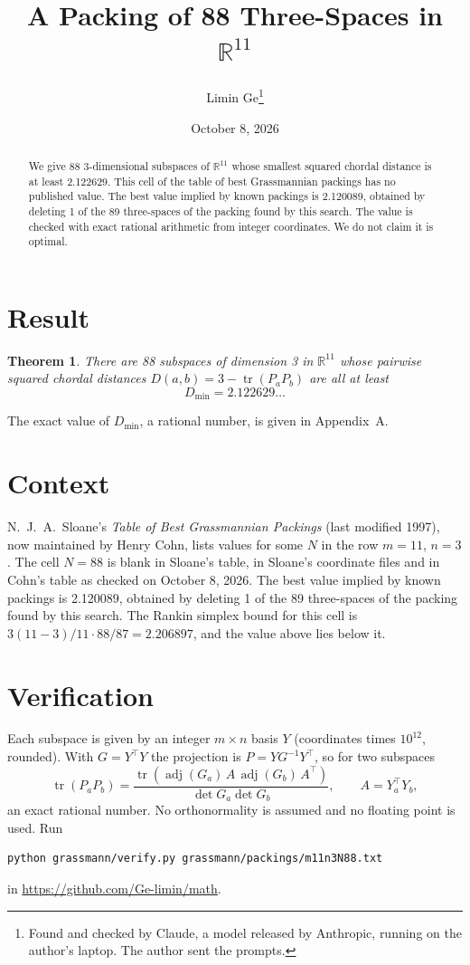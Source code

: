 \documentclass[11pt,a4paper]{article}
\title{A Packing of 88 Three-Spaces in $\mathbb{R}^{11}$}
\author{Limin Ge\thanks{Found and checked by Claude, a model released by Anthropic, running on the author's laptop. The author sent the prompts.}}
\date{October 8, 2026}
\newtheorem*{theorem}{Theorem}
\begin{document}
\maketitle
\begin{abstract}
We give 88 3-dimensional subspaces of $\mathbb{R}^{11}$ whose smallest squared chordal distance is at least 2.122629. This cell of the table of best Grassmannian packings has no published value. The best value implied by known packings is 2.120089, obtained by deleting 1 of the 89 three-spaces of the packing found by this search. The value is checked with exact rational arithmetic from integer coordinates. We do not claim it is optimal.
\end{abstract}

\section{Result}
\begin{theorem}
There are 88 subspaces of dimension 3 in $\mathbb{R}^{11}$ whose pairwise squared chordal distances $D(a,b) = 3 - \operatorname{tr}(P_aP_b)$ are all at least
\[ D_{\min} = 2.122629\ldots \]
\end{theorem}
The exact value of $D_{\min}$, a rational number, is given in Appendix~A.


\section{Context}
N.~J.~A.~Sloane's \emph{Table of Best Grassmannian Packings} (last modified 1997), now maintained by Henry Cohn, lists values for some $N$ in the row $m=11$, $n=3$. The cell $N=88$ is blank in Sloane's table, in Sloane's coordinate files and in Cohn's table as checked on October 8, 2026. The best value implied by known packings is 2.120089, obtained by deleting 1 of the 89 three-spaces of the packing found by this search. The Rankin simplex bound for this cell is $3(11-3)/11\cdot 88/87 = 2.206897$, and the value above lies below it.


\section{Verification}
Each subspace is given by an integer $m\times n$ basis $Y$ (coordinates times $10^{12}$, rounded). With $G=Y^\top Y$ the projection is $P=YG^{-1}Y^\top$, so for two subspaces
\[ \operatorname{tr}(P_aP_b)=\frac{\operatorname{tr}(\operatorname{adj}(G_a)\,A\,\operatorname{adj}(G_b)\,A^\top)}{\det G_a\det G_b},\qquad A=Y_a^\top Y_b, \]
an exact rational number. No orthonormality is assumed and no floating point is used. Run
\begin{verbatim}
python grassmann/verify.py grassmann/packings/m11n3N88.txt
\end{verbatim}
in \url{https://github.com/Ge-limin/math}.
\end{document}
